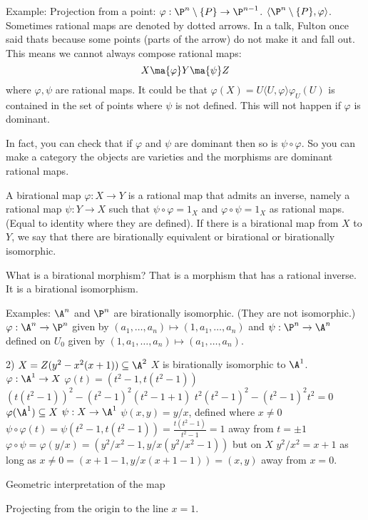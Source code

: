 Example: Projection from a point: $\varphi: \P^n \setminus \{P\} \to \P^{n-1}$. $\langle \P^n \setminus \{P\}, \varphi \rangle$. Sometimes rational maps are denoted by dotted arrows. In a talk, Fulton once said thats because some points (parts of the arrow) do not make it and fall out. This means we cannot always compose rational maps:
	\[
	X \ma{\varphi} Y \ma{\psi} Z
	\]
where $\varphi, \psi$ are rational maps. It could be that $\varphi(X)= U \langle U, \varphi \rangle \varphi_U(U)$ is contained in the set of points where $\psi$ is not defined. This will not happen if $\varphi$ is dominant. 



In fact, you can check that if $\varphi$ and $\psi$ are dominant then so is $\psi \circ \varphi$. So you can make a category the objects are varieties and the morphisms are dominant rational maps. 


\begin{dfn}
A birational map $\varphi: X \to Y$ is a rational map that admits an inverse, namely a rational map $\psi: Y \to X$ such that $\psi \circ \varphi= 1_X$ and $\varphi \circ \psi= 1_X$ as rational maps. (Equal to identity where they are defined). If there is a birational map from $X$ to $Y$, we say that there are birationally equivalent or birational or birationally isomorphic.
\end{dfn}


What is a birational morphism? That is a morphism that has a rational inverse. It is a birational isomorphism. 


Examples: $\A^n$ and $\P^n$ are birationally isomorphic. (They are not isomorphic.) $\varphi: \A^n \to \P^n$ given by $(a_1,\ldots,a_n) \mapsto (1,a_1,\ldots,a_n)$ and $\psi: \P^n \to \A^n$ defined on $U_0$ given by $(1,a_1,\ldots,a_n) \mapsto (a_1,\ldots,a_n)$. 

2) $X= Z(y^2-x^2(x+1)) \subseteq \A^2$ %
$X$ is birationally isomorphic to $\A^1$.
$\varphi: \A^1 \to X$
$\varphi(t)= (t^2-1,t(t^2-1))$
$(t(t^2-1))^2 - (t^2-1)^2(t^2-1+1)$
$t^2(t^2-1)^2 -(t^2-1)^2t^2=0$
$\varphi(\A^1) \subseteq X$
$\psi: X \to \A^1$
$\psi(x,y)= y/x$, defined where $x \neq 0$
$\psi \circ \varphi(t)= \psi(t^2-1,t(t^2-1))= \frac{t(t^2-1)}{t^2-1}=1$
away from $t= \pm 1$
$\varphi \circ \psi= \varphi(y/x)= (y^2/x^2-1,y/x(y^2/x^2-1))$ but on $X$ $y^2/x^2= x+1$ as long as $x \neq 0= (x+1-1,y/x(x+1-1))= (x,y)$ away from $x=0$.

Geometric interpretation of the map

Projecting from the origin to the line $x=1$.

